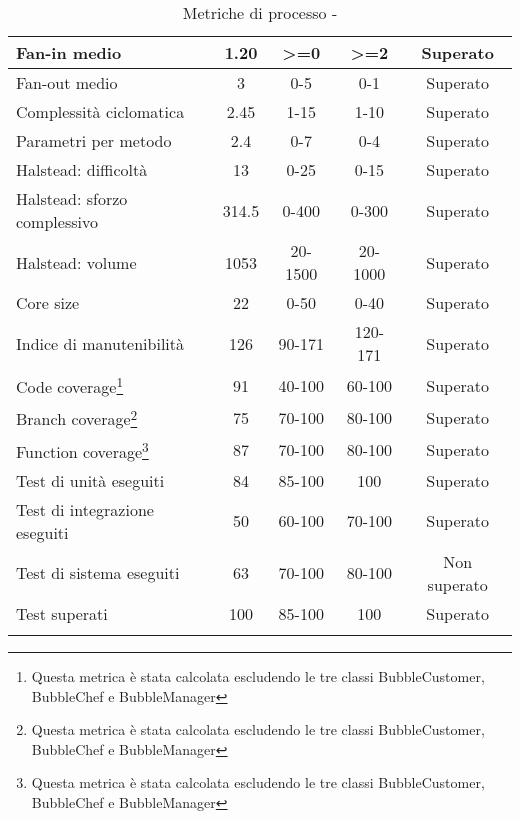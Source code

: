 \begin{longtable}{|m{5cm}|c|c|c|c|}
	\hline Fan-in medio & 1.20 & >=0 & >=2 & Superato \\
	\hline Fan-out medio & 3 & 0-5 & 0-1 & Superato \\
	\hline Complessità ciclomatica & 2.45 & 1-15 & 1-10 & Superato \\
	\hline Parametri per metodo & 2.4 & 0-7 & 0-4 & Superato \\
	\hline Halstead: difficoltà & 13 & 0-25 & 0-15 & Superato \\
	\hline Halstead: sforzo complessivo & 314.5 & 0-400 & 0-300 & Superato\\
	\hline Halstead: volume & 1053 & 20-1500 & 20-1000 & Superato \\
	\hline Core size & 22 & 0-50 & 0-40 & Superato \\
	\hline Indice di manutenibilità & 126 & 90-171 & 120-171 & Superato \\
	\hline Code coverage\footnote{Questa metrica è stata calcolata escludendo le tre classi BubbleCustomer, BubbleChef e BubbleManager} & 91 & 40-100 & 60-100 & Superato \\
	\hline Branch coverage\footnote{Questa metrica è stata calcolata escludendo le tre classi BubbleCustomer, BubbleChef e BubbleManager} & 75 & 70-100 & 80-100 & Superato \\
	\hline Function coverage\footnote{Questa metrica è stata calcolata escludendo le tre classi BubbleCustomer, BubbleChef e BubbleManager} & 87 & 70-100 & 80-100 & Superato \\
	\hline Test di unità eseguiti & 84 & 85-100 & 100 & Superato \\
	\hline Test di integrazione eseguiti & 50 & 60-100 & 70-100 & Superato \\
	\hline Test di sistema eseguiti & 63 & 70-100 & 80-100 & Non superato \\
	\hline Test superati & 100 & 85-100 & 100 & Superato \\
	\hline
	\caption{Metriche di processo - \RQ{}}
\end{longtable}

